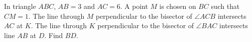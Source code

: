 In triangle $ABC$, $AB=3$ and $AC=6$. A point $M$ is chosen on $BC$ such that $CM=1$. The line through $M$ perpendicular to the bisector of $\angle ACB$ intersects $AC$ at $K$. The line through $K$ perpendicular to the bisector of $\angle BAC$ intersects line $AB$ at $D$. Find $BD$.
